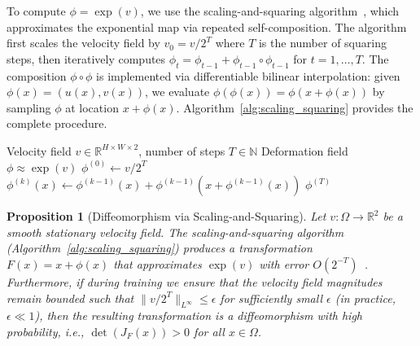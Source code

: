 \documentclass[10pt,journal,compsoc]{IEEEtran}
\newtheorem{proposition}{Proposition}
\begin{document}
To compute $\phi = \exp(v)$, we use the scaling-and-squaring algorithm~\cite{arsigny2006logdiff}, which approximates the exponential map via repeated self-composition. The algorithm first scales the velocity field by $v_0 = v / 2^T$ where $T$ is the number of squaring steps, then iteratively computes $\phi_t = \phi_{t-1} + \phi_{t-1} \circ \phi_{t-1}$ for $t = 1, \ldots, T$. The composition $\phi \circ \phi$ is implemented via differentiable bilinear interpolation: given $\phi(x) = (u(x), v(x))$, we evaluate $\phi(\phi(x)) = \phi(x + \phi(x))$ by sampling $\phi$ at location $x + \phi(x)$. Algorithm~\ref{alg:scaling_squaring} provides the complete procedure.

\begin{algorithm}[t]
\caption{Scaling-and-Squaring for Diffeomorphic Integration}
\label{alg:scaling_squaring}
\begin{algorithmic}[1]
\REQUIRE Velocity field $v \in \mathbb{R}^{H \times W \times 2}$, number of steps $T \in \mathbb{N}$
\ENSURE Deformation field $\phi \approx \exp(v)$
\STATE $\phi^{(0)} \leftarrow v / 2^T$ \quad {}
    \STATE $\phi^{(k)}(x) \leftarrow \phi^{(k-1)}(x) + \phi^{(k-1)}(x + \phi^{(k-1)}(x))$ \quad {}
\ENDFOR
\RETURN $\phi^{(T)}$
\end{algorithmic}
\end{algorithm}

\begin{proposition}[Diffeomorphism via Scaling-and-Squaring]
\label{prop:diffeomorphism}
Let $v: \Omega \rightarrow \mathbb{R}^2$ be a smooth stationary velocity field. The scaling-and-squaring algorithm (Algorithm~\ref{alg:scaling_squaring}) produces a transformation $F(x) = x + \phi(x)$ that approximates $\exp(v)$ with error $O(2^{-T})$~\cite{arsigny2006logdiff}. Furthermore, if during training we ensure that the velocity field magnitudes remain bounded such that $\|v/2^T\|_{L^\infty} \leq \epsilon$ for sufficiently small $\epsilon$ (in practice, $\epsilon \ll 1$), then the resulting transformation is a diffeomorphism with high probability, i.e., $\det(J_F(x)) > 0$ for all $x \in \Omega$.
\end{proposition}
\end{document}
